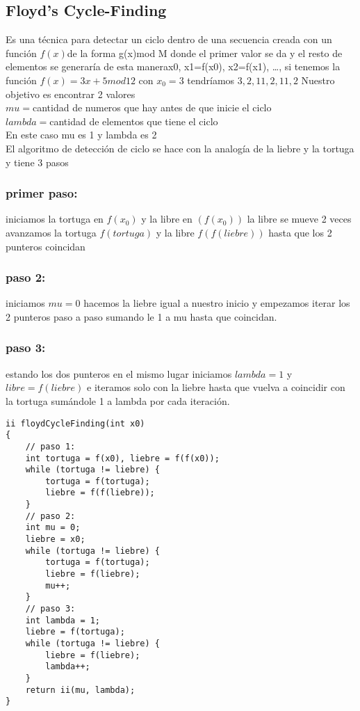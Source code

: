 \subsection{Floyd’s Cycle-Finding}
Es una técnica para detectar un ciclo dentro de una secuencia creada con un función $f(x)$de la forma g(x)mod M
donde el primer valor se da y el resto de elementos  se generaría de esta manera{x0, x1=f(x0), x2=f(x1),  …},
si tenemos la función $f(x)=3x+5 mod 12$ con $x_0=3$ tendríamos ${3, 2,11,2,11,2}$ Nuestro objetivo es encontrar 2 valores
\\$mu = $cantidad de numeros que hay antes de que inicie el ciclo
\\$lambda = $cantidad de elementos que tiene el ciclo
\\En este caso mu es 1 y lambda es 2
\\El algoritmo de detección de ciclo se hace con la analogía de la liebre y la tortuga y tiene 3 pasos
\subsubsection{primer paso:}
iniciamos la  tortuga en $f(x_0)$ y la libre en $(f(x_0))$ la libre se mueve 2 veces avanzamos la tortuga $f(tortuga)$ y la libre $f(f(liebre))$ hasta que los 2 punteros coincidan
\subsubsection{paso 2:}
iniciamos $mu=0$ hacemos la liebre igual a nuestro inicio y empezamos iterar los 2 punteros paso a paso sumando le 1 a mu hasta que coincidan.
\subsubsection{paso 3:}
estando los dos punteros en el mismo lugar iniciamos $lambda=1$ y $libre=f(liebre)$
e iteramos solo con la liebre hasta que vuelva a coincidir con la tortuga sumándole 1 a lambda por cada iteración.
\begin{minipage}{\textwidth}
\begin{lstlisting}[style=C,caption=floydCycleFinding.cpp]
ii floydCycleFinding(int x0)
{
    // paso 1:
    int tortuga = f(x0), liebre = f(f(x0));
    while (tortuga != liebre) {
        tortuga = f(tortuga);
        liebre = f(f(liebre));
    }
    // paso 2:
    int mu = 0;
    liebre = x0;
    while (tortuga != liebre) {
        tortuga = f(tortuga);
        liebre = f(liebre);
        mu++;
    }
    // paso 3:
    int lambda = 1;
    liebre = f(tortuga);
    while (tortuga != liebre) {
        liebre = f(liebre);
        lambda++;
    }
    return ii(mu, lambda);
}
\end{lstlisting}
\end{minipage}
